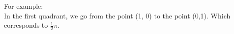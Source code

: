 \documentclass[preview]{standalone}
\begin{document}
\begin{center}
For example: \\ In the first quadrant, we go from the point (1, 0) to the point (0,1). Which corresponds to $\frac{1}{2} \pi$.
\end{center}
\end{document}
